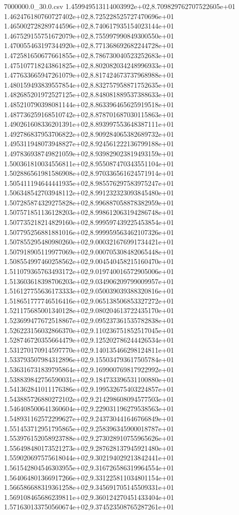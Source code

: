 \begin{filecontents*}{7000000.0_30.0.csv}
1.459949513114003992e+02,8.709829762707522605e+01
1.462476180760727402e+02,8.725228525727470696e+01
1.465002728289744596e+02,8.740617935154023144e+01
1.467529155751672079e+02,8.755997990849300550e+01
1.470055463197344920e+02,8.771368692682244728e+01
1.472581650677661855e+02,8.786730040523252683e+01
1.475107718243861825e+02,8.802082034248996933e+01
1.477633665947261079e+02,8.817424673737968988e+01
1.480159493839557854e+02,8.832757958871752635e+01
1.482685201972527125e+02,8.848081889537388633e+01
1.485210790398081144e+02,8.863396465625919518e+01
1.487736259168510742e+02,8.878701687030115863e+01
1.490261608336201391e+02,8.893997553648387111e+01
1.492786837953706822e+02,8.909284065382689732e+01
1.495311948073948827e+02,8.924561222136799188e+01
1.497836938749821059e+02,8.939829023819493159e+01
1.500361810034556811e+02,8.955087470343551104e+01
1.502886561981586908e+02,8.970336561624571914e+01
1.505411194644441935e+02,8.985576297583975247e+01
1.506348542703948112e+02,8.991232323093845480e+01
1.507285874329275828e+02,8.996887058878382959e+01
1.507571851136128203e+02,8.998612063194286748e+01
1.507735218214829160e+02,8.999597439225453854e+01
1.507795256881881016e+02,8.999959563462107326e+01
1.507855295480980260e+02,9.000321676991734421e+01
1.507918905119977069e+02,9.000705308482065448e+01
1.508554997460258562e+02,9.004540458215160470e+01
1.511079365763493172e+02,9.019740016572905006e+01
1.513603618398706203e+02,9.034906209799009957e+01
1.516127755636173333e+02,9.050039039388320816e+01
1.518651777746516416e+02,9.065138506853327272e+01
1.521175685001340128e+02,9.080204613722435170e+01
1.523699477672518867e+02,9.095237361535782838e+01
1.526223156032866370e+02,9.110236751852517045e+01
1.528746720355664479e+02,9.125202786244426534e+01
1.531270170914597770e+02,9.140135466298124811e+01
1.533793507984312896e+02,9.155034793617505784e+01
1.536316731839795864e+02,9.169900769817922992e+01
1.538839842756590031e+02,9.184733396531100880e+01
1.541362841011176386e+02,9.199532675403224857e+01
1.543885726880272102e+02,9.214298608094577503e+01
1.546408500641360604e+02,9.229031196279538563e+01
1.548931162572299627e+02,9.243730441646766849e+01
1.551453712951795865e+02,9.258396345900018787e+01
1.553976152058923788e+02,9.273028910755965626e+01
1.556498480173521273e+02,9.287628137945921480e+01
1.559020697575618044e+02,9.302194029213842441e+01
1.561542804546303955e+02,9.316726586319964554e+01
1.564064801366917266e+02,9.331225811034801154e+01
1.566586688319361258e+02,9.345691705145509331e+01
1.569108465686239811e+02,9.360124270451433404e+01
1.571630133750560674e+02,9.374523508765287261e+01

\end{filecontents*}
